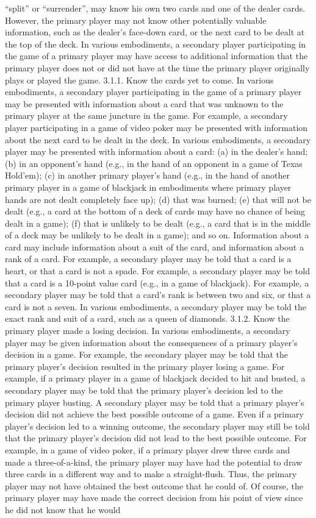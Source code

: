 \documentclass[11pt,a4paper]{article}
\begin{document}
“split” or “surrender”, may know his own two cards and one of the dealer cards. However, the primary player may not know other potentially valuable information, such as the dealer's face-down card, or the next card to be dealt at the top of the deck. In various embodiments, a secondary player participating in the game of a primary player may have access to additional information that the primary player does not or did not have at the time the primary player originally plays or played the game. 3.1.1. Know the cards yet to come. In various embodiments, a secondary player participating in the game of a primary player may be presented with information about a card that was unknown to the primary player at the same juncture in the game. For example, a secondary player participating in a game of video poker may be presented with information about the next card to be dealt in the deck. In various embodiments, a secondary player may be presented with information about a card: (a) in the dealer's hand; (b) in an opponent's hand (e.g., in the hand of an opponent in a game of Texas Hold'em); (c) in another primary player's hand (e.g., in the hand of another primary player in a game of blackjack in embodiments where primary player hands are not dealt completely face up); (d) that was burned; (e) that will not be dealt (e.g., a card at the bottom of a deck of cards may have no chance of being dealt in a game); (f) that is unlikely to be dealt (e.g., a card that is in the middle of a deck may be unlikely to be dealt in a game); and so on. Information about a card may include information about a suit of the card, and information about a rank of a card. For example, a secondary player may be told that a card is a heart, or that a card is not a spade. For example, a secondary player may be told that a card is a 10-point value card (e.g., in a game of blackjack). For example, a secondary player may be told that a card's rank is between two and six, or that a card is not a seven. In various embodiments, a secondary player may be told the exact rank and suit of a card, such as a queen of diamonds. 3.1.2. Know the primary player made a losing decision. In various embodiments, a secondary player may be given information about the consequences of a primary player's decision in a game. For example, the secondary player may be told that the primary player's decision resulted in the primary player losing a game. For example, if a primary player in a game of blackjack decided to hit and busted, a secondary player may be told that the primary player's decision led to the primary player busting. A secondary player may be told that a primary player's decision did not achieve the best possible outcome of a game. Even if a primary player's decision led to a winning outcome, the secondary player may still be told that the primary player's decision did not lead to the best possible outcome. For example, in a game of video poker, if a primary player drew three cards and made a three-of-a-kind, the primary player may have had the potential to draw three cards in a different way and to make a straight-flush. Thus, the primary player may not have obtained the best outcome that he could of. Of course, the primary player may have made the correct decision from his point of view since he did not know that he would 
\end{document}
